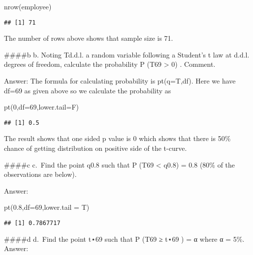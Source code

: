 \documentclass[
]{article}
\newenvironment{Shaded}{\begin{snugshade}}{\end{snugshade}}
\newcommand{\AttributeTok}[1]{\textcolor[rgb]{0.77,0.63,0.00}{#1}}
\newcommand{\DecValTok}[1]{\textcolor[rgb]{0.00,0.00,0.81}{#1}}
\newcommand{\FloatTok}[1]{\textcolor[rgb]{0.00,0.00,0.81}{#1}}
\newcommand{\FunctionTok}[1]{\textcolor[rgb]{0.00,0.00,0.00}{#1}}
\newcommand{\NormalTok}[1]{#1}
\begin{document}
\begin{Shaded}
\begin{Highlighting}[]
\FunctionTok{nrow}\NormalTok{(employee)}
\end{Highlighting}
\end{Shaded}

\begin{verbatim}
## [1] 71
\end{verbatim}

The number of rows above shows that sample size is 71.

\#\#\#\#b b. Noting Td.d.l. a random variable following a Student's t
law at d.d.l. degrees of freedom, calculate the probability P (T69
\textgreater{} 0) . Comment.

Answer: The formula for calculating probability is pt(q=T,df). Here we
have df=69 as given above so we calculate the probability as

\begin{Shaded}
\begin{Highlighting}[]
\FunctionTok{pt}\NormalTok{(}\DecValTok{0}\NormalTok{,}\AttributeTok{df=}\DecValTok{69}\NormalTok{,}\AttributeTok{lower.tail=}\NormalTok{F)}
\end{Highlighting}
\end{Shaded}

\begin{verbatim}
## [1] 0.5
\end{verbatim}

The result shows that one sided p value is 0 which shows that there is
50\% chance of getting distribution on positive side of the t-curve.

\#\#\#\#c c.~Find the point q0.8 such that P (T69 \textless{} q0.8) =
0.8 (80\% of the observations are below).

Answer:

\begin{Shaded}
\begin{Highlighting}[]
\FunctionTok{pt}\NormalTok{(}\FloatTok{0.8}\NormalTok{,}\AttributeTok{df=}\DecValTok{69}\NormalTok{,}\AttributeTok{lower.tail =}\NormalTok{ T)}
\end{Highlighting}
\end{Shaded}

\begin{verbatim}
## [1] 0.7867717
\end{verbatim}

\#\#\#\#d d.~Find the point t⋆69 such that P (\textbar T69\textbar{} ≥
t⋆69 ) = α where α = 5\%. Answer:
\end{document}
